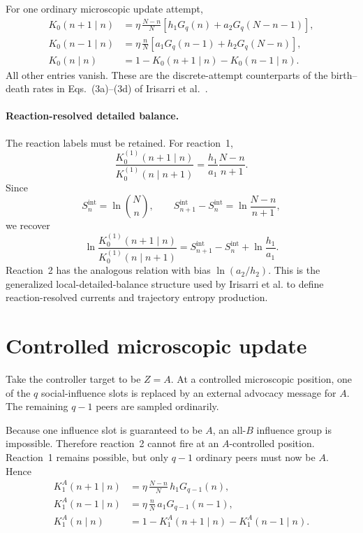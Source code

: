 \documentclass[11pt]{article}
\begin{document}
For one ordinary microscopic update attempt,
\begin{align}
K_0(n+1\mid n)
&=
\eta\,\frac{N-n}{N}
\left[
h_1G_q(n)+a_2G_q(N-n-1)
\right], \label{eq:k0plus}\\
K_0(n-1\mid n)
&=
\eta\,\frac{n}{N}
\left[
a_1G_q(n-1)+h_2G_q(N-n)
\right], \label{eq:k0minus}\\
K_0(n\mid n)
&=
1-K_0(n+1\mid n)-K_0(n-1\mid n). \label{eq:k0stay}
\end{align}
All other entries vanish. These are the discrete-attempt counterparts of the
birth--death rates in Eqs.~(3a)--(3d) of Irisarri et al.~\cite{irisarri2026}.

\paragraph{Reaction-resolved detailed balance.}
The reaction labels must be retained. For reaction~1,
\[
\frac{K_0^{(1)}(n+1\mid n)}
     {K_0^{(1)}(n\mid n+1)}
=
\frac{h_1}{a_1}\frac{N-n}{n+1}.
\]
Since
\[
S_n^{\mathrm{int}}=\ln\binom{N}{n},
\qquad
S_{n+1}^{\mathrm{int}}-S_n^{\mathrm{int}}
=
\ln\frac{N-n}{n+1},
\]
we recover
\[
\ln
\frac{K_0^{(1)}(n+1\mid n)}
     {K_0^{(1)}(n\mid n+1)}
=
S_{n+1}^{\mathrm{int}}-S_n^{\mathrm{int}}
+\ln\frac{h_1}{a_1}.
\]
Reaction~2 has the analogous relation with bias $\ln(a_2/h_2)$. This is the
generalized local-detailed-balance structure used by Irisarri et al. to define
reaction-resolved currents and trajectory entropy production.

\section{Controlled microscopic update}

Take the controller target to be $Z=A$. At a controlled microscopic position,
one of the $q$ social-influence slots is replaced by an external advocacy message
for $A$. The remaining $q-1$ peers are sampled ordinarily.

Because one influence slot is guaranteed to be $A$, an all-$B$ influence group is
impossible. Therefore reaction~2 cannot fire at an $A$-controlled position.
Reaction~1 remains possible, but only $q-1$ ordinary peers must now be $A$. Hence
\begin{align}
K_1^A(n+1\mid n)
&=
\eta\,\frac{N-n}{N}\,
h_1G_{q-1}(n), \label{eq:k1plus}\\
K_1^A(n-1\mid n)
&=
\eta\,\frac{n}{N}\,
a_1G_{q-1}(n-1), \label{eq:k1minus}\\
K_1^A(n\mid n)
&=
1-K_1^A(n+1\mid n)-K_1^A(n-1\mid n). \label{eq:k1stay}
\end{align}
\end{document}
